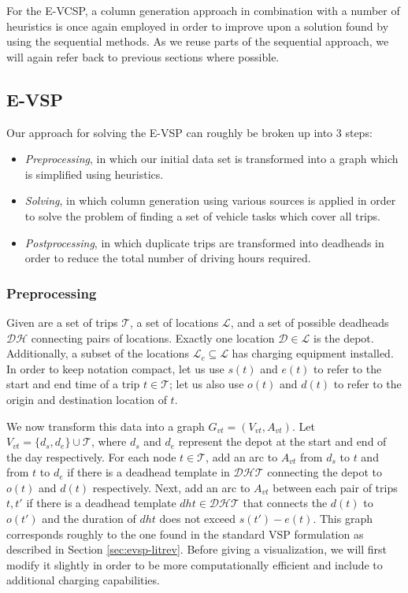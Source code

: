 \documentclass[]{article}
\begin{document}
For the E-VCSP, a column generation approach in combination with a number of heuristics is once again employed in order to improve upon a solution found by using the sequential methods. As we reuse parts of the sequential approach, we will again refer back to previous sections where possible.

\subsection{E-VSP} \label{sec:evsp-methodology}
Our approach for solving the E-VSP can roughly be broken up into 3 steps: 
\begin{itemize}
  \item \textit{Preprocessing}, in which our initial data set is transformed into a graph which is simplified using heuristics.
  \item \textit{Solving}, in which column generation using various sources is applied in order to solve the problem of finding a set of vehicle tasks which cover all trips. 
  \item \textit{Postprocessing}, in which duplicate trips are transformed into deadheads in order to reduce the total number of driving hours required. 
\end{itemize} 
\subsubsection{Preprocessing}
Given are a set of trips $\mathcal{T}$, a set of locations $\mathcal{L}$, and a set of possible deadheads $\mathcal{DH}$ connecting pairs of locations. Exactly one location $\mathcal{D} \in \mathcal{L}$ is the depot. Additionally, a subset of the locations $\mathcal{L}_c \subseteq \mathcal{L}$ has charging equipment installed. In order to keep notation compact, let us use $s(t)$ and $e(t)$ to refer to the start and end time of a trip $t \in \mathcal{T}$; let us also use $o(t)$ and $d(t)$ to refer to the origin and destination location of $t$.

We now transform this data into a graph $G_{vt} = (V_{vt}, A_{vt})$. Let $V_{vt} = \{ d_{s}, d_{e} \} \cup \mathcal{T}$, where $d_{s}$ and $d_{e}$ represent the depot at the start and end of the day respectively. For each node $t \in \mathcal{T}$, add an arc to $A_{vt}$ from $d_{s}$ to $t$ and from $t$ to $d_{e}$ if there is a deadhead template in $\mathcal{DHT}$ connecting the depot to $o(t)$ and $d(t)$ respectively. Next, add an arc to $A_{vt}$ between each pair of trips $t, t'$ if there is a deadhead template $dht \in \mathcal{DHT}$ that connects the $d(t)$ to $o(t')$ and the duration of $dht$ does not exceed $s(t') - e(t)$. This graph corresponds roughly to the one found in the standard VSP formulation as described in Section \ref{sec:evsp-litrev}. Before giving a visualization, we will first modify it slightly in order to be more computationally efficient and include to additional charging capabilities.
\end{document}
